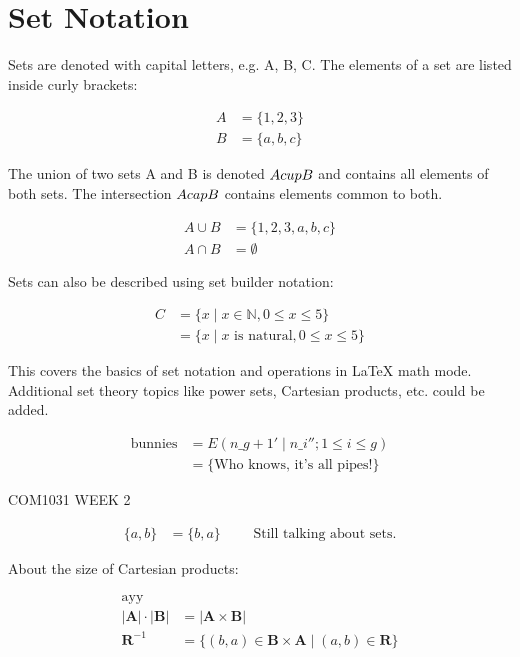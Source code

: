 \documentclass{article}
\begin{document}
\section{Set Notation}

Sets are denoted with capital letters, e.g. A, B, C. The elements of a set are listed inside curly brackets:

\begin{align*}  
A &= \{1, 2, 3\} \\
B &= \{a, b, c\}  
\end{align*}

The union of two sets A and B is denoted $A \\cup B$ and contains all elements of both sets. The intersection $A \\cap B$ contains elements common to both.

\begin{align*}
A \cup B &= \{1, 2, 3, a, b, c\} \\ 
A \cap B &= \emptyset
\end{align*}

Sets can also be described using set builder notation:

\begin{align*}
C &= \{x \mid x \in \mathbb{N}, 0 \leq x \leq 5\} \\
&= \{x \mid \textrm{$x$ is natural}, 0 \leq x \leq 5\}  
\end{align*}

This covers the basics of set notation and operations in LaTeX math mode. Additional set theory topics like power sets, Cartesian products, etc. could be added.

\begin{align*}
\textrm{bunnies} &= E(n\_{g+1}' \mid n\_i''; 1\le i\le g) \\
               &= \{\textrm{Who knows, it's all pipes!}\}  
\end{align*}

COM1031 WEEK 2

\begin{align*} 
\{a, b\} &= \{b, a\} \qquad \textrm{ Still talking about sets.}
\end{align*}

About the size of Cartesian products: 

\begin{align*}
\textrm{ayy} \\
\lvert \mathbf{A} \rvert \cdot \lvert \mathbf{B} \rvert &= \lvert \mathbf{A} \times \mathbf{B} \rvert \\
\mathbf{R}^{-1} &= \{(b, a) \in \mathbf{B} \times \mathbf{A} \mid (a, b) \in \mathbf{R}\}
\end{align*}
\end{document}
